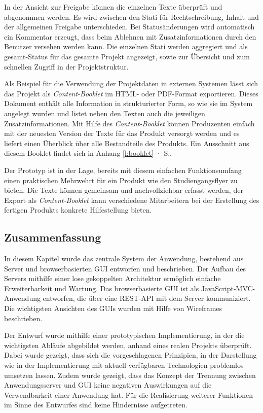 In der Ansicht zur Freigabe können die einzelnen Texte überprüft und abgenommen werden. Es wird zwischen den Stati für Rechtschreibung, Inhalt und der allgemeinen Freigabe unterschieden. Bei Statusänderungen wird automatisch ein Kommentar erzeugt, dass beim Ablehnen mit Zusatzinformationen durch den Benutzer versehen werden kann. Die einzelnen Stati werden aggregiert und als gesamt-Status für das gesamte Projekt angezeigt, sowie zur Übersicht und zum schnellen Zugriff in der Projektstruktur.

Als Beispiel für die Verwendung der Projektdaten in externen Systemen lässt sich das Projekt als \emph{Content-Booklet} im HTML- oder PDF-Format exportieren. Dieses Dokument enthält alle Information in strukturierter Form, so wie sie im System angelegt wurden und listet neben den Texten auch die jeweiligen Zusatzinformationen. Mit Hilfe des \emph{Content-Booklet} können Produzenten einfach mit der neuesten Version der Texte für das Produkt versorgt werden und es liefert einen Überblick über alle Bestandteile des Produkts. Ein Ausschnitt aus diesem Booklet findet sich in Anhang \ref{l:booklet} · S.\pageref{l:booklet}.

\secbar

Der Prototyp ist in der Lage, bereits mit diesem einfachen Funktionsumfang einen praktischen Mehrwehrt für ein Produkt wie den Studiengangsflyer zu bieten. Die Texte können gemeinsam und nachvollziehbar erfasst werden, der Export als \emph{Content-Booklet} kann verschiedene Mitarbeitern bei der Erstellung des fertigen Produkts konkrete Hilfestellung bieten.

\pagebreak

\subsection{Zusammenfassung}

In diesem Kapitel wurde das zentrale System der Anwendung, bestehend aus Server und browserbasierten GUI entworfen und beschrieben. Der Aufbau des Servers mithilfe einer lose gekoppelten Architektur ermöglich einfache Erweiterbarkeit und Wartung. Das browserbasierte GUI ist als JavaScript-MVC-Anwendung entworfen, die über eine REST-API mit dem Server kommuniziert. Die wichtigsten Ansichten des GUIs wurden mit Hilfe von Wireframes beschrieben. 

Der Entwurf wurde mithilfe einer prototypischen Implementierung, in der die wichtigsten Abläufe abgebildet werden, anhand eines realen Projekts überprüft. Dabei wurde gezeigt, dass sich die vorgeschlagenen Prinzipien, in der Darstellung wie in der Implementierung mit aktuell verfügbaren Technologien problemlos umsetzen lassen. Zudem wurde gezeigt, dass das Konzept der Trennung zwischen Anwendungsserver und GUI keine negativen Auswirkungen auf die Verwendbarkeit einer Anwendung hat. Für die Realisierung weiterer Funktionen im Sinne des Entwurfes sind keine Hindernisse aufgetreten.

